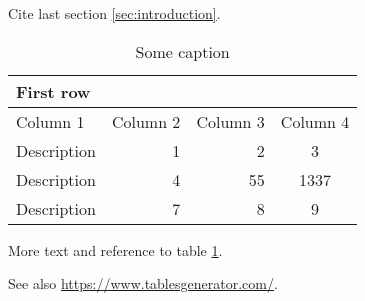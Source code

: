 Cite last section \ref{sec:introduction}.

\begin{table}[h]
    \caption{Some caption}
    \centering
    \begin{tabular}{lrrc}
        \toprule
        First row \\
        \midrule
        Column 1 & Column 2 & Column 3 & Column 4\\
        \midrule
        Description & 1 & 2 & 3 \\
        Description & 4 & 55 & 1337 \\
        Description & 7 & 8 & 9 \\
        \bottomrule
    \end{tabular}
    \label{tab:mytable}
\end{table}

More text and reference to table \ref{tab:mytable}.

See also \url{https://www.tablesgenerator.com/}.
